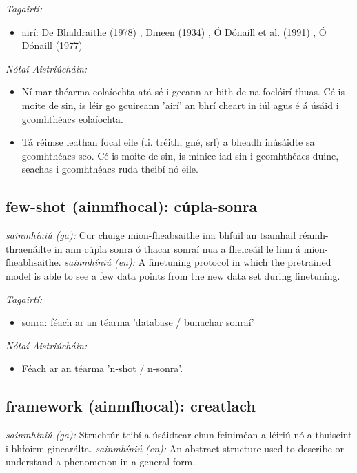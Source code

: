 \documentclass{article}
\begin{document}
 \noindent \textit{Tagairtí:}
\begin{itemize}
	\item airí: De Bhaldraithe (1978) \cite{de-bhaldraithe}, Dineen (1934) \cite{dineen}, Ó Dónaill et al. (1991) \cite{focloir-beag}, Ó Dónaill (1977) \cite{odonaill}
\end{itemize}

 \noindent \textit{Nótaí Aistriúcháin:}
\begin{itemize}
	\item Ní mar théarma eolaíochta atá sé i gceann ar bith de na foclóirí thuas. Cé is moite de sin, is léir go gcuireann 'airí' an bhrí cheart in iúl agus é á úsáid i gcomhthéacs eolaíochta.
	\item Tá réimse leathan focal eile (.i. tréith, gné, srl) a bheadh inúsáidte sa gcomhthéacs seo. Cé is moite de sin, is minice iad sin i gcomhthéacs duine, seachas i gcomhthéacs ruda theibí nó eile.
\end{itemize}


\subsection*{few-shot (ainmfhocal): cúpla-sonra} 
 \noindent \textit{sainmhíniú (ga):} Cur chuige mion-fheabsaithe ina bhfuil an tsamhail réamh-thraenáilte in ann cúpla sonra ó thacar sonraí nua a fheiceáil le linn á mion-fheabhsaithe.
\newline\newline
 \noindent \textit{sainmhíniú (en):} A finetuning protocol in which the pretrained model is able to see a few data points from the new data set during finetuning.
\newline

 \noindent \textit{Tagairtí:}
\begin{itemize}
	\item sonra: féach ar an téarma 'database / bunachar sonraí'
\end{itemize}

 \noindent \textit{Nótaí Aistriúcháin:}
\begin{itemize}
	\item Féach ar an téarma 'n-shot / n-sonra'.
\end{itemize}


\subsection*{framework (ainmfhocal): creatlach} 
 \noindent \textit{sainmhíniú (ga):} Struchtúr teibí a úsáidtear chun feiniméan a léiriú nó a thuiscint i bhfoirm ginearálta.
\newline\newline
 \noindent \textit{sainmhíniú (en):} An abstract structure used to describe or understand a phenomenon in a general form.
\newline
\end{document}
